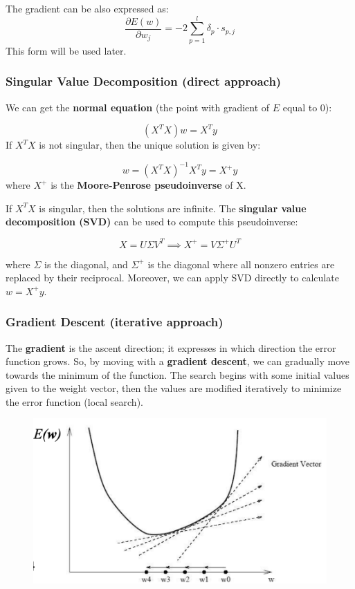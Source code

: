 The gradient can be also expressed as:
\begin{equation*}
    \dfrac{\partial E(w)}{\partial w_j} = -2\sum_{p=1}^l \delta_p \cdot s_{p,j}
\end{equation*}
This form will be used later.

\subsubsection{Singular Value Decomposition (direct approach)}
We can get the \textbf{normal equation} (the point with gradient of $E$ equal to 0):

\begin{equation*}
(X^TX)w = X^Ty
\end{equation*}
If $X^TX$ is not singular, then the unique solution is given by:

\begin{equation*}
    w = (X^TX)^{-1}X^Ty = X^+y
\end{equation*}
where $X^+$ is the \textbf{Moore-Penrose pseudoinverse} of X.

If $X^TX$ is singular, then the solutions are infinite. The \textbf{singular value decomposition (SVD)} can be used to compute this pseudoinverse:

\begin{equation*}
    X = U\Sigma V^T \implies X^+ = V \Sigma^+U^T
\end{equation*}

where $\Sigma$ is the diagonal, and $\Sigma^+$ is the diagonal where all nonzero entries are replaced by their reciprocal. Moreover, we can apply SVD directly to calculate $w = X^+y$.

\subsubsection{Gradient Descent (iterative approach)}

The \textbf{gradient} is the ascent direction; it expresses in which direction the error function grows. So, by moving with a \textbf{gradient descent}, we can gradually move towards the minimum of the function. The search begins with some initial values given to the weight vector, then the values are modified iteratively to minimize the error function (local search).

\begin{figure}[h]
    \centering
    \includegraphics[width=0.5\linewidth]{img/gradient descent.png}
\end{figure}

